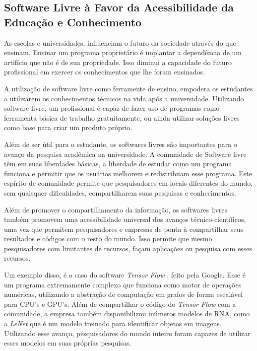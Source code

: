 \subsection{Software Livre à Favor da Acessibilidade da Educação e Conhecimento}

As escolas e universidades, influenciam o futuro da sociedade através do que ensinam. Ensinar um programa proprietário é implantar a dependência de um artifício que não é de sua propriedade. Isso diminui a capacidade do futuro profissional em exercer os conhecimentos que lhe foram ensinados. 

A utilização de software livre como ferramente de ensino, empodera os estudantes a utilizarem os conhecimentos técnicos na vida após a universidade. Utilizando software livre, um profissional é capaz de fazer uso de programas como ferramenta básica de trabalho gratuitamente, ou ainda utilizar soluções livres como base para criar um produto próprio.

Além de ser útil para o estudante, os softwares livres são importantes para o avanço da pesquisa acadêmica na universidade. A comunidade de Software livre têm em suas liberdades básicas, a liberdade de estudar como um programa funciona e permitir que os usuários melhorem e redistribuam esse programa. Este espírito de comunidade permite que pesquisadores em locais diferentes do mundo, sem quaisquer dificuldades, compartilharem suas pesquisas e conhecimentos. 

Além de promover o compartilhamento da informação, os softwares livres também promovem uma  acessibilidade universal dos avanços técnico-científicos, uma vez que permitem pesquisadores e empresas de ponta à compartilhar seus resultados e códigos com o resto do mundo. Isso permite que mesmo pesquisadores com limitantes de recursos, façam aplicações ou pesquisa com esses recursos.

Um exemplo disso, é o caso do software \textit{Tensor Flow} \cite{AbadiABBCCCDDDG16}, feito pela Google. Esse é um programa extremamente complexo que funciona como motor de operações numéricas, utilizando a abstração de computação em grafos de forma escalável para CPU's e GPU's. Além de compartilhar o código do \textit{Tensor Flow} com a comunidade, a empresa também disponibilizou inúmeros modelos de RNA, como a \textit{LeNet} \cite{szegedy2015going} que é um modelo treinado para identificar objetos em imagens. Utilizando esse avanço, pesquisadores do mundo inteiro foram capazes de utilizar esses modelos em suas próprias pesquisas.








